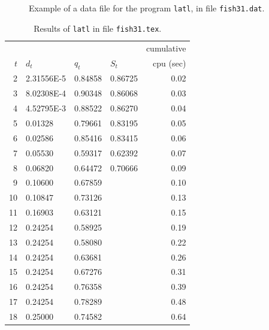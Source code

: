 \begin{figure}[hbt] 
\centerline {}
\caption { Example of a data file for the program {\tt latl},
           in file {\tt fish31.dat}. }
\label {lat1.dat}
\end{figure}


%
\begin {table}[hbt] 
\caption { Results of {\tt latl} in file {\tt fish31.tex}. }
\label {lat1.tex}
\medskip
\centering
\begin {tabular}{|rlllr|}
\hline
 &&&&  cumulative \\
   $t$ &      $d_t$   &      $q_t$  &      $S_t$  &  cpu (sec)\\
\hline
    2  &   2.31556E-5 &     0.84858 &     0.86725 &      0.02 \\
    3  &   8.02308E-4 &     0.90348 &     0.86068 &      0.03 \\
    4  &   4.52795E-3 &     0.88522 &     0.86270 &      0.04 \\
    5  &      0.01328 &     0.79661 &     0.83195 &      0.05 \\
    6  &      0.02586 &     0.85416 &     0.83415 &      0.06 \\
    7  &      0.05530 &     0.59317 &     0.62392 &      0.07 \\
    8  &      0.06820 &     0.64472 &     0.70666 &      0.09 \\
    9  &      0.10600 &     0.67859 &             &      0.10 \\
   10  &      0.10847 &     0.73126 &             &      0.13 \\
   11  &      0.16903 &     0.63121 &             &      0.15 \\
   12  &      0.24254 &     0.58925 &             &      0.19 \\
   13  &      0.24254 &     0.58080 &             &      0.22 \\
   14  &      0.24254 &     0.63681 &             &      0.26 \\
   15  &      0.24254 &     0.67276 &             &      0.31 \\
   16  &      0.24254 &     0.76358 &             &      0.39 \\
   17  &      0.24254 &     0.78289 &             &      0.48 \\
   18  &      0.25000 &     0.74582 &             &      0.64 \\

\end{tabular}
\end{table}
